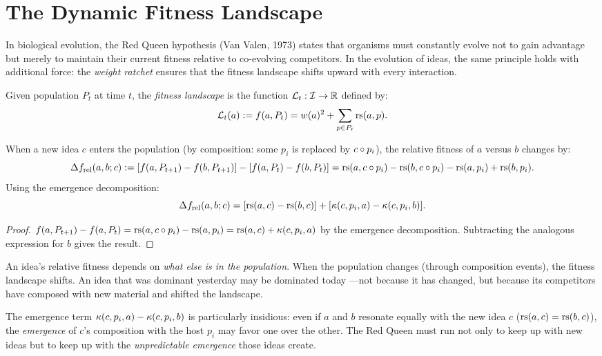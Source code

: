 \section{The Dynamic Fitness Landscape}

In biological evolution, the Red Queen hypothesis (Van Valen, 1973) states
that organisms must constantly evolve not to gain advantage but merely to
maintain their current fitness relative to co-evolving competitors.  In the
evolution of ideas, the same principle holds with additional force: the
\emph{weight ratchet} ensures that the fitness landscape shifts upward
with every interaction.

\begin{definition}
\label{def:fitness-landscape}
Given population $P_t$ at time $t$, the \emph{fitness landscape} is the
function $\mathcal{L}_t : \mathcal{I} \to \mathbb{R}$ defined by:
\[
  \mathcal{L}_t(a) := f(a, P_t) = w(a)^2 + \sum_{p \in P_t} \mathrm{rs}(a, p).
\]
\end{definition}

\begin{theorem}
\label{thm:landscape-shift}
When a new idea $c$ enters the population (by composition: some $p_i$ is
replaced by $c \circ p_i$), the relative fitness of $a$ versus $b$
changes by:
\[
  \Delta f_{\text{rel}}(a, b; c) :=
  [f(a, P_{t+1}) - f(b, P_{t+1})] - [f(a, P_t) - f(b, P_t)]
  = \mathrm{rs}(a, c \circ p_i) - \mathrm{rs}(b, c \circ p_i) - \mathrm{rs}(a, p_i) + \mathrm{rs}(b, p_i).
\]
Using the emergence decomposition:
\[
  \Delta f_{\text{rel}}(a, b; c) = [\mathrm{rs}(a, c) - \mathrm{rs}(b, c)] +
  [\kappa(c, p_i, a) - \kappa(c, p_i, b)].
\]
\end{theorem}

\begin{proof}
$f(a, P_{t+1}) - f(a, P_t) = \mathrm{rs}(a, c \circ p_i) - \mathrm{rs}(a, p_i) =
\mathrm{rs}(a, c) + \kappa(c, p_i, a)$ by the emergence decomposition.
Subtracting the analogous expression for $b$ gives the result.
\end{proof}

\begin{interpretation}
\label{interp:red-queen}
An idea's relative fitness depends on \emph{what else is in the population}.
When the population changes (through composition events), the fitness
landscape shifts.  An idea that was dominant yesterday may be dominated today
---not because it has changed, but because its competitors have composed with
new material and shifted the landscape.

The emergence term $\kappa(c, p_i, a) - \kappa(c, p_i, b)$ is particularly
insidious: even if $a$ and $b$ resonate equally with the new idea $c$
($\mathrm{rs}(a,c) = \mathrm{rs}(b,c)$), the \emph{emergence} of $c$'s composition with the
host $p_i$ may favor one over the other.  The Red Queen must run not only to
keep up with new ideas but to keep up with the \emph{unpredictable emergence}
those ideas create.
\end{interpretation}

